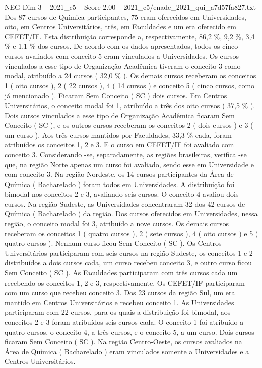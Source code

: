 \begin{textsample}{NEG Dim 3 – 2021\_c5 – Score 2.00 – 2021\_c5/enade\_2021\_qui\_a7d57fa827.txt}
Dos 87 cursos de Química participantes, 75 eram oferecidos em Universidades, oito, em Centros Universitários, três, em Faculdades e um era oferecido em CEFET/IF.
Esta distribuição corresponde a, respectivamente, 86,2 \%, 9,2 \%, 3,4 \% e 1,1 \% dos cursos.
De acordo com os dados apresentados, todos os cinco cursos avaliados com conceito 5 eram vinculados a Universidades.
Os cursos vinculados a esse tipo de Organização Acadêmica tiveram o conceito 3 como modal, atribuído a 24 cursos ( 32,0 \% ).
Os demais cursos receberam os conceitos 1 ( oito cursos ), 2 ( 22 cursos ), 4 ( 14 cursos ) e conceito 5 ( cinco cursos, como já mencionado ).
Ficaram Sem Conceito ( SC ) dois cursos.
Em Centros Universitários, o conceito modal foi 1, atribuído a três dos oito cursos ( 37,5 \% ).
Dois cursos vinculados a esse tipo de Organização Acadêmica ficaram Sem Conceito ( SC ), e os outros cursos receberam os conceitos 2 ( dois cursos ) e 3 ( um curso ).
Aos três cursos mantidos por Faculdades, 33,3 \% cada, foram atribuídos os conceitos 1, 2 e 3.
E o curso em CEFET/IF foi avaliado com conceito 3.
Considerando -se, separadamente, as regiões brasileiras, verifica -se que, na região Norte apenas um curso foi avaliado, sendo esse em Universidade e com conceito 3.
Na região Nordeste, os 14 cursos participantes da Área de Química ( Bacharelado ) foram todos em Universidades.
A distribuição foi bimodal nos conceitos 2 e 3, avaliando seis cursos.
O conceito 4 avaliou dois cursos.
Na região Sudeste, as Universidades concentraram 32 dos 42 cursos de Química ( Bacharelado ) da região.
Dos cursos oferecidos em Universidades, nessa região, o conceito modal foi 3, atribuído a nove cursos.
Os demais cursos receberam os conceitos 1 ( quatro cursos ), 2 ( sete cursos ), 4 ( oito cursos ) e 5 ( quatro cursos ).
Nenhum curso ficou Sem Conceito ( SC ).
Os Centros Universitários participaram com seis cursos na região Sudeste, os conceitos 1 e 2 distribuídos a dois cursos cada, um curso recebeu conceito 3, e outro curso ficou Sem Conceito ( SC ).
As Faculdades participaram com três cursos cada um recebendo os conceitos 1, 2 e 3, respectivamente.
Os CEFET/IF participaram com um curso que recebeu conceito 3.
Dos 23 cursos da região Sul, um era mantido em Centros Universitários e recebeu conceito 1.
As Universidades participaram com 22 cursos, para os quais a distribuição foi bimodal, aos conceitos 2 e 3 foram atribuídos seis cursos cada.
O conceito 1 foi atribuído a quatro cursos, o conceito 4, a três cursos, e o conceito 5, a um curso.
Dois cursos ficaram Sem Conceito ( SC ).
Na região Centro-Oeste, os cursos avaliados na Área de Química ( Bacharelado ) eram vinculados somente a Universidades e a Centros Universitários.

\end{textsample}
